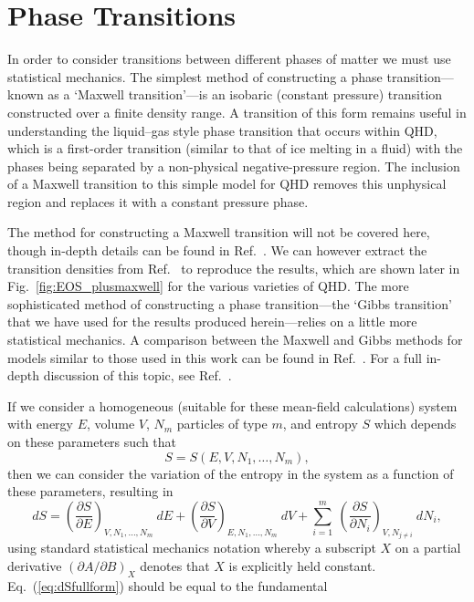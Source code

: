 \documentclass[11pt,a4paper,twoside]{carrollthesis}
\newcommand{\be}{\begin{equation}}
\newcommand{\ee}{\end{equation}}
\newcommand{\del}{\partial}
\newcommand{\emdash}{\hspace{1pt}---\hspace{1pt}}
\begin{document}
\section{Phase Transitions}\label{sec:phasetransitions}
%
In order to consider transitions between different phases of matter we
must use statistical mechanics. The simplest method of constructing a
phase transition\emdash known as a `Maxwell transition'\emdash is an
isobaric (constant pressure) transition constructed over a finite
density range. A transition of this form remains useful in
understanding the liquid--gas style phase transition that occurs
within QHD, which is a first-order transition (similar to that of ice
melting in a fluid) with the phases being separated by a non-physical
negative-pressure region. The inclusion of a Maxwell transition to
this simple model for QHD removes this unphysical region and replaces
it with a constant pressure phase.\par
%
The method for constructing a Maxwell transition will not be covered
here, though in-depth details can be found in
Ref.~\cite{Muller:1995ji}. We can however extract the transition
densities from Ref.~\cite{Serot:1984ey} to reproduce the results,
which are shown later in Fig.~\ref{fig:EOS_plusmaxwell} for the
various varieties of QHD. The more sophisticated method of
constructing a phase transition\emdash the `Gibbs
transition'~\cite{Glendenning:2001pe} that we have used for the
results produced herein\emdash relies on a little more statistical
mechanics. A comparison between the Maxwell and Gibbs methods for
models similar to those used in this work can be found in
Ref.~\cite{Bhattacharyya:2009fg}. For a full in-depth discussion of
this topic, see Ref.~\cite{Reif}.\par
%
If we consider a homogeneous (suitable for these mean-field
calculations) system with energy $E$, volume $V$, $N_m$ particles of
type $m$, and entropy $S$ which depends on these parameters such that
%
\be S=S(E,V,N_1,\ldots,N_m), \ee
%
then we can consider the variation of the entropy in the system as a
function of these parameters, resulting in
%
\be \label{eq:dSfullform} dS = \left(\frac{\del S}{\del
  E}\right)_{V,N_1,\ldots,N_m} \ dE + \left(\frac{\del S}{\del
  V}\right)_{E,N_1,\ldots,N_m} \ dV + \sum_{i=1}^m \ \left(\frac{\del
  S}{\del N_i}\right)_{V,N_{j\neq i}} \ dN_i, \ee
%
using standard statistical mechanics notation whereby a subscript $X$
on a partial derivative $\displaystyle{\left(\del A / \del
  B\right)_{X}}$ denotes that $X$ is explicitly held constant.
Eq.~(\ref{eq:dSfullform}) should be equal to the fundamental
\end{document}
